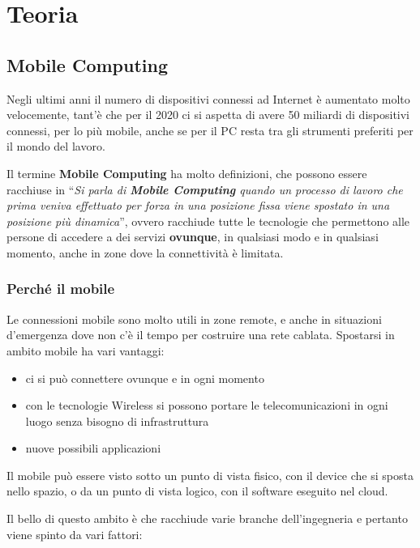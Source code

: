 \part{Teoria}

\chapter{Mobile Computing}
\label{mobile-computing}

Negli ultimi anni il numero di dispositivi connessi ad Internet è
aumentato molto velocemente, tant'è che per il 2020 ci si aspetta di
avere 50 miliardi di dispositivi connessi, per lo più mobile, anche se
per il PC resta tra gli strumenti preferiti per il mondo del lavoro.

Il termine \textbf{Mobile Computing} ha molto definizioni, che possono
essere racchiuse in ``\emph{Si parla di \textbf{Mobile Computing} quando
un processo di lavoro che prima veniva effettuato per forza in una
posizione fissa viene spostato in una posizione più dinamica}'', ovvero
racchiude tutte le tecnologie che permettono alle persone di accedere a
dei servizi \textbf{ovunque}, in qualsiasi modo e in qualsiasi momento, anche
in zone dove la connettività è limitata.

\section{Perché il mobile}

Le connessioni mobile sono molto utili in zone remote, e
anche in situazioni d'emergenza dove non c'è il tempo per costruire una rete
cablata.
Spostarsi in ambito mobile ha vari vantaggi:

\begin{itemize}
\item ci si può connettere ovunque e in ogni momento
\item con le tecnologie Wireless si possono portare le telecomunicazioni in
  ogni luogo senza bisogno di infrastruttura
\item nuove possibili applicazioni
\end{itemize}

Il mobile può essere visto sotto un punto di vista fisico, con il
device che si sposta nello spazio, o da un punto di vista logico, con il
software eseguito nel cloud.

Il bello di questo ambito è che racchiude varie branche dell'ingegneria
e pertanto viene spinto da vari fattori:

